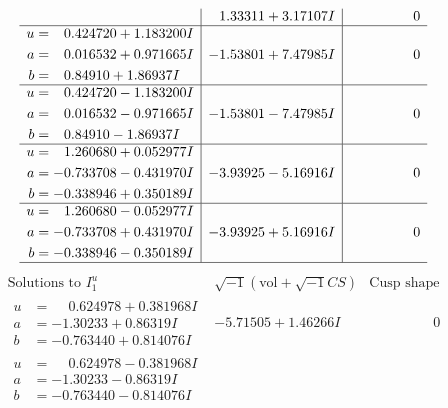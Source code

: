 \documentclass[1p]{elsarticle_modified}
\theoremstyle{definition}
\newcommand{\I}{\sqrt{-1}}
\begin{document}
$$\begin{array}{c|c|c}
 & \phantom{-}1.33311 + 3.17107 I & \phantom{-0.000000 } 0 \\ \hline\begin{aligned}
u &= \phantom{-}0.424720 + 1.183200 I \\
a &= \phantom{-}0.016532 + 0.971665 I \\
b &= \phantom{-}0.84910 + 1.86937 I\end{aligned}
 & -1.53801 + 7.47985 I & \phantom{-0.000000 } 0 \\ \hline\begin{aligned}
u &= \phantom{-}0.424720 - 1.183200 I \\
a &= \phantom{-}0.016532 - 0.971665 I \\
b &= \phantom{-}0.84910 - 1.86937 I\end{aligned}
 & -1.53801 - 7.47985 I & \phantom{-0.000000 } 0 \\ \hline\begin{aligned}
u &= \phantom{-}1.260680 + 0.052977 I \\
a &= -0.733708 - 0.431970 I \\
b &= -0.338946 + 0.350189 I\end{aligned}
 & -3.93925 - 5.16916 I & \phantom{-0.000000 } 0 \\ \hline\begin{aligned}
u &= \phantom{-}1.260680 - 0.052977 I \\
a &= -0.733708 + 0.431970 I \\
b &= -0.338946 - 0.350189 I\end{aligned}
 & -3.93925 + 5.16916 I & \phantom{-0.000000 } 0\\
 \hline 
 \end{array}$$\newpage$$\begin{array}{c|c|c}  
\text{Solutions to }I^u_{1}& \I (\text{vol} + \sqrt{-1}CS) & \text{Cusp shape}\\
 \hline 
\begin{aligned}
u &= \phantom{-}0.624978 + 0.381968 I \\
a &= -1.30233 + 0.86319 I \\
b &= -0.763440 + 0.814076 I\end{aligned}
 & -5.71505 + 1.46266 I & \phantom{-0.000000 } 0 \\ \hline\begin{aligned}
u &= \phantom{-}0.624978 - 0.381968 I \\
a &= -1.30233 - 0.86319 I \\
b &= -0.763440 - 0.814076 I\end{aligned}

\end{array}$$
\end{document}
